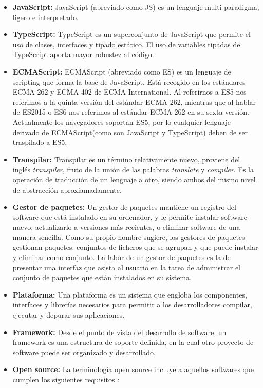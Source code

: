 \documentclass[openright,twoside,10pt]{book}
\begin{document}
    \begin{itemize}
    \item
      \textbf{JavaScript:} JavaScript (abreviado como JS) es un lenguaje
      multi-paradigma, ligero e interpretado. \cite{mozilla_javascript}
    \item
      \textbf{TypeScript:} TypeScript es un superconjunto de JavaScript que
      permite el uso de clases, interfaces y tipado estático. El uso de
      variables tipadas de TypeScript aporta mayor robustez al código.
      \cite{enriqueoriol2017, stackoverflow_Typescript}
    \item
      \textbf{ECMAScript:} ECMAScript (abreviado como ES) es un lenguaje de
      scripting que forma la base de JavaScript. Está recogido en los
      estándares ECMA-262 y ECMA-402 de ECMA International. Al referirnos a
      ES5 nos referimos a la quinta versión del estándar ECMA-262, mientras
      que al hablar de ES2015 o ES6 nos referimos al estándar ECMA-262 en su
      sexta versión. Actualmente los navegadores soportan ES5, por lo
      cualquier lenguaje derivado de ECMAScript(como son JavaScript y
      TypeScript) deben de ser traspilado a ES5. \cite{mozilla_ecmascript}
    \item
      \textbf{Transpilar:} Transpilar es un término relativamente nuevo,
      proviene del inglés \emph{transpiler}, fruto de la unión de las
      palabras \emph{translate} y \emph{compiler}. Es la operación de
      traducción de un lenguaje a otro, siendo ambos del mismo nivel de
      abstracción aproxiamadamente.
      \cite{enriquefernandezguerra_typescript, builtbyedgar_transpilar}
    \item
      \textbf{Gestor de paquetes:} Un gestor de paquetes mantiene un
      registro del software que está instalado en su ordenador, y le permite
      instalar software nuevo, actualizarlo a versiones más recientes, o
      eliminar software de una manera sencilla. Como su propio nombre
      sugiere, los gestores de paquetes gestionan paquetes: conjuntos de
      ficheros que se agrupan y que puede instalar y eliminar como conjunto.
      La labor de un gestor de paquetes es la de presentar una interfaz que
      asista al usuario en la tarea de administrar el conjunto de paquetes
      que están instalados en su sistema. \cite{debian_gestorpaquetes}
    \item
      \textbf{Plataforma:} Una plataforma es un sistema que engloba los
      componentes, interfaces y librerías necesarios para permitir a los
      desarrolladores compilar, ejecutar y depurar sus aplicaciones.
    \item
      \textbf{Framework:} Desde el punto de vista del desarrollo de
      software, un framework es una estructura de soporte definida, en la
      cual otro proyecto de software puede ser organizado y desarrollado.
    \item
      \textbf{Open source:} La terminología open source incluye a aquellos
      softwares que cumplen los siguientes requisitos
      \cite{opensource_definition} :
    

\end{itemize}
\end{document}
